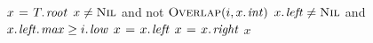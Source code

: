 \begin{codebox}
\li $x \gets \attrib{T}{root}$
\li \While $x \neq \textnormal{\scshape Nil}$ and not $\proc{Overlap}(i, \attrib{x}{int})$ 
\li \Do \If $\attrib{x}{left} \neq \const{Nil}$ and $\attrib{\attrib{x}{left}}{max} \ge \attrib{i}{low}$
\li      \Then $x \gets \attrib{x}{left}$
\li      \Else $x \gets \attrib{x}{right}$
         \End
    \End
\li \Return $x$
\end{codebox}
